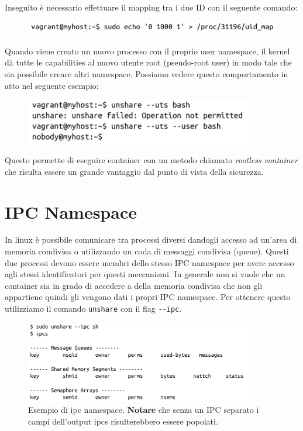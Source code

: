 Inseguito è necessario effettuare il mapping tra i due ID con il seguente comando:

\begin{figure}[H]
    \centering
    \includegraphics[width=\textwidth, keepaspectratio]{capitoli/os_security/imgs/user3.png}
\end{figure}

Quando viene creato un nuovo processo con il proprio user namespace, il kernel
dà tutte le capabilities al nuovo utente root (pseudo-root user) in modo tale che
sia possibile creare altri namespace. Possiamo vedere questo comportamento in atto
nel seguente esempio:

\begin{figure}[H]
    \centering
    \includegraphics[width=10cm, keepaspectratio]{capitoli/os_security/imgs/user4.png}
\end{figure}

Questo permette di eseguire container con un metodo chiamato \textit{rootless container}
che risulta essere un grande vantaggio dal punto di vista della sicurezza.

\section{IPC Namespace}

In linux è possibile comunicare tra processi diversi dandogli accesso ad un'area
di memoria condivisa o utilizzando un coda di messaggi condivisa (queue).
Questi due processi devono essere membri dello stesso IPC namespace per avere
accesso agli stessi identificatori per questi meccanismi.
In generale non si vuole che un container sia in grado di accedere a della memoria
condivisa che non gli appartiene quindi gli vengono dati i propri IPC namespace.
Per ottenere questo utilizziamo il comando \verb|unshare| con il flag \verb|--ipc|.

\begin{figure}[H]
    \centering
    \includegraphics[width=10cm, keepaspectratio]{capitoli/os_security/imgs/user5.png}
    \caption{Esempio di ipc namespace. \textbf{Notare} che senza un IPC separato
        i campi dell'output ipcs risulterebbero essere popolati.}
\end{figure}

